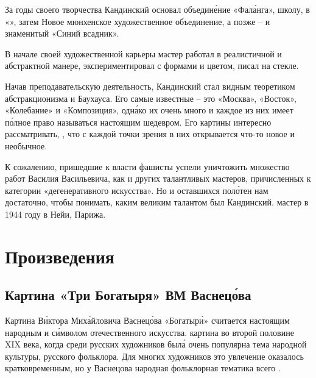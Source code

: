 За годы своего творчества Кандинский основал объедин\'{е}ние «Фал\'{а}нга», школу,  в «», затем  Новое мюнхенское художественное объединение, а позже -- и знаменитый «Синий всадник».

В начале своей художественной карьеры мастер работал в реалистичной и  абстрактной манере, экспериментировал с формами и цветом, писал на стекле.

Начав преподавательскую деятельность, Кандинский  стал видным теоретиком абстракционизма и Баухауса. Его самые известные  -- это «Москва», «Восток», «Колебание» и «Композиция», одн\'{а}ко их очень много и каждое из них имеет п\'{о}лное право называться настоящим шедевром. Его картины  интересно рассматривать,  , что с каждой точки зрения в них открывается что-то новое и необычное.

К сожалению, пришедшие к власти фашисты успели уничтожить множество работ Василия Васильевича, как и других талантливых мастеров, причисленных к категории «дегенеративного искусства». Но и оставшихся пол\'{о}тен нам достаточно, чтобы понимать, каким великим талантом был Кандинский.  мастер в 1944 году в Нейи,  Парижа.


\section{Произведения}
\subsection{Картина «Три Богатыря» ВМ Васнец\'{о}ва}

Картина В\'{и}ктора Мих\'{а}йловича Васнец\'{о}ва «Богатыр\'{и}»  считается настоящим народным  и с\'{и}мволом отечественного искусства.  картина во второй половине XIX века, когда среди русских художников был\'{а} очень популярна тема народной культуры, русского фольклора. Для многих художников это увлечение оказалось кратковременным, но у Васнецова народная фольклорная тематика   всего .

